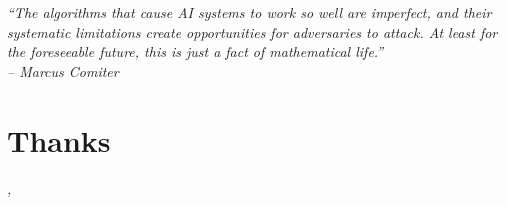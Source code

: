 
\cleardoublepage
{}
{}
\begin{flushright}{
	\slshape
	“The algorithms
	that cause AI systems
	to work so well are
	imperfect, and their
	systematic limitations
	create opportunities for
	adversaries to attack. At
	least for the foreseeable
	future, this is just a fact of
	mathematical life.”
	\\ – Marcus Comiter} \\


	\medskip

\end{flushright}



\begingroup
\let\clearpage\relax
\let\cleardoublepage\relax
\let\cleardoublepage\relax

\chapter*{Thanks}





\noindent\textit{\myLocation, \myTime}
\hfill \myName

\endgroup

